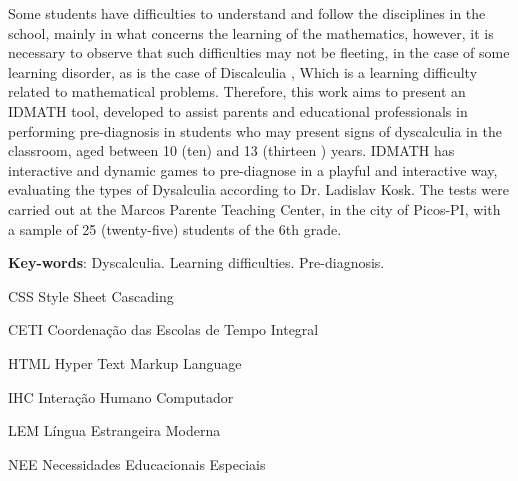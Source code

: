 \documentclass[
	12pt,				%
    oneside,			%
	a4paper,			%
	english,			%
	french,				%
	spanish,			%
	brazil,				%
	]{abntex2}
\begin{document}
\begin{resumo}[Abstract]

Some students have difficulties to understand and follow the disciplines in the school, mainly in what concerns the learning of the mathematics, however, it is necessary to observe that such difficulties may not be fleeting, in the case of some learning disorder, as is the case of Discalculia , Which is a learning difficulty related to mathematical problems. Therefore, this work aims to present an IDMATH tool, developed to assist parents and educational professionals in performing pre-diagnosis in students who may present signs of dyscalculia in the classroom, aged between 10 (ten) and 13 (thirteen ) years. IDMATH has interactive and dynamic games to pre-diagnose in a playful and interactive way, evaluating the types of Dysalculia according to Dr. Ladislav Kosk. The tests were carried out at the Marcos Parente Teaching Center, in the city of Picos-PI, with a sample of 25 (twenty-five) students of the 6th grade.

 \vspace{\onelineskip}
    
 \noindent
 \textbf{Key-words}: Dyscalculia. Learning difficulties. Pre-diagnosis.
 
\end{resumo}



\listoffigures* %
\cleardoublepage %


\listoftables*
\cleardoublepage

\begin{siglas}
  \item[CSS] Style Sheet Cascading
  \item[CETI] Coordenação das Escolas de Tempo Integral 
  \item[HTML] Hyper Text Markup Language
  \item[IHC] Interação Humano Computador 
  \item[LEM] Língua Estrangeira Moderna
  \item[NEE] Necessidades Educacionais Especiais  
\end{siglas}



\end{document}
